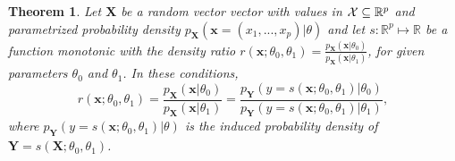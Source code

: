 \documentclass[12pt]{article}
\numberwithin{equation}{section}
\theoremstyle{plain}
\newtheorem{theorem}{Theorem}
\begin{document}
\begin{theorem}
    \label{thm:ratio-equivalence}
    Let $\mathbf{X}$ be a random vector vector with values in ${\cal X} \subseteq \mathbb{R}^p$ and parametrized probability
    density $p_{\mathbf{X}}(\mathbf{x} = (x_1, ..., x_p)|\theta)$ and let
    $s : \mathbb{R}^p \mapsto \mathbb{R}$ be a function monotonic with the density ratio
    $r(\mathbf{x};\theta_0,\theta_1) = \frac{p_\mathbf{X}(\mathbf{x}|\theta_0)}{p_\mathbf{X}(\mathbf{x}|\theta_1)}$,
    for given parameters $\theta_0$ and $\theta_1$. In these conditions,
    \begin{equation}
        r(\mathbf{x};\theta_0,\theta_1) = \frac{p_\mathbf{X}(\mathbf{x}|\theta_0)}{p_\mathbf{X}(\mathbf{x}|\theta_1)} = \frac{p_\mathbf{Y}(y=s(\mathbf{x};\theta_0,\theta_1)|\theta_0)}{p_\mathbf{Y}(y=s(\mathbf{x};\theta_0,\theta_1)|\theta_1)},
    \end{equation}
    where $p_\mathbf{Y}(y=s(\mathbf{x};\theta_0,\theta_1)|\theta)$ is the induced probability density of
    $\mathbf{Y} = s(\mathbf{X};\theta_0,\theta_1)$.
\end{theorem}
\end{document}
